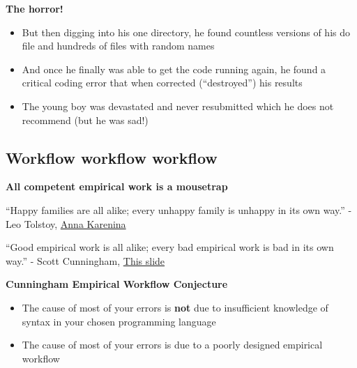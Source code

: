 \documentclass[notes=show]{beamer}
\begin{document}
\begin{frame}[plain]
\begin{center}
\textbf{The horror!}
\end{center}

\begin{itemize}
\item But then digging into his one directory, he found countless versions of his do file and hundreds of files with random names
\item And once he finally was able to get the code running again, he found a critical coding error that when corrected (``destroyed'') his results
\item The young boy was devastated and never resubmitted which he does not recommend (but he was sad!)
\end{itemize}

\end{frame}

\subsection{Workflow workflow workflow}

\begin{frame}
\begin{center}
\textbf{All competent empirical work is a mousetrap}
\end{center}

``Happy families are all alike; every unhappy family is unhappy in its own way.'' - Leo Tolstoy, \underline{Anna Karenina}
\bigskip

``Good empirical work is all alike; every bad empirical work is bad in its own way.'' - Scott Cunningham, \underline{This slide}

\end{frame}


\begin{frame}[plain]
\begin{center}
\textbf{Cunningham Empirical Workflow Conjecture}
\end{center}

\begin{itemize}
\item The cause of most of your errors is \textbf{not} due to insufficient knowledge of syntax in your chosen programming language
\item The cause of most of your errors is due to a poorly designed empirical workflow
\end{itemize}

\end{frame}
\end{document}
